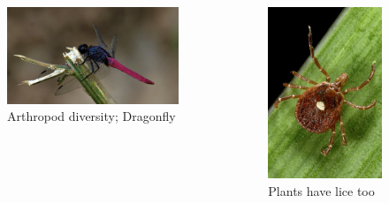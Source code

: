 \documentclass[
  ignorenonframetext,
  aspectratio=169]{beamer}
\newcommand{\bcolumns}{\begin{columns}[T, onlytextwidth]}
\newcommand{\ecolumns}{\end{columns}}
\begin{document}
\begin{frame}{}
\protect\hypertarget{section-2}{}
\bcolumns


\begin{figure}
\includegraphics[width=0.92\linewidth]{./../images/dragonfly_D7is9PFUEAAoQyS} \caption{Arthropod diversity; Dragonfly}\label{fig:dragonfly}
\end{figure}


\begin{figure}
\includegraphics[width=0.54\linewidth]{./../images/plant_lice_D4Ti2L6XsAI4xsQ} \caption{Plants have lice too}\label{fig:plantlice}
\end{figure}

\ecolumns
\end{frame}
\end{document}
